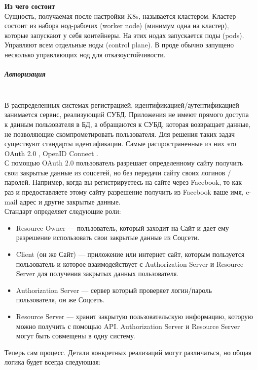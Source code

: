     \textbf{Из чего состоит} ~\\
    Сущность, получаемая после настройки K8s, называется кластером. Кластер состоит из набора нод-рабочих (worker node) (минимум одна на кластер), которые запускают у себя контейнеры. На этих нодах запускается поды (pods). Управляют всем отдельные ноды (control plane). В проде обычно запущено несколько управляющих нод для отказоустойчивости. \autocite{KuberComponents}

\subparagraph{Авторизация}~\\

В распределенных системах регистрацией, идентификацией/аутентификацией занимается
сервис, реализующий СУБД. Приложения не имеют прямого доступа к данным
пользователя в БД, а обращаются к СУБД, которая возвращает данные, не позволяющие
скомпрометировать пользователя. Для решения таких задач существуют стандарты
идентификации. Самые распространенные из них это OAuth 2.0 \autocite{OAuth2.0}, OpenID Connect \autocite{OpenIDConnect}.~\\

С помощью OAuth 2.0 пользователь разрешает определенному сайту получить свои
закрытые данные из соцсетей, но без передачи сайту своих логинов / паролей. Например,
когда вы регистрируетесь на сайте через Facebook, то как раз и предоставляете этому сайту
разрешение получить из Facebook ваше имя, e-mail адрес и другие закрытые данные.~\\

Стандарт определяет следующие роли:

\begin{itemize}
    \item Resource Owner — пользователь, который заходит на Сайт и дает ему разрешение использовать свои закрытые данные из Соцсети.
    \item Client (он же Сайт) — приложение или интернет сайт, которым пользуется пользователь и которое взаимодействует с Authorization Server и Resource Server для получения закрытых данных пользователя.
    \item Authorization Server — сервер который проверяет логин/пароль пользователя, он же Соцсеть.
    \item Resource Server — хранит закрытую пользовательскую информацию, которую можно получить с помощью API. Authorization Server и Resource Server могут быть совмещены в одну систему.\autocite{OAuthRoles}
\end{itemize}

Теперь сам процесс. Детали конкретных реализаций могут различаться, но общая логика
будет всегда следующая:

